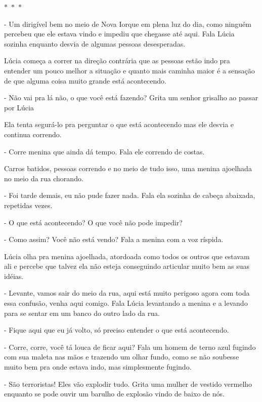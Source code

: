 \begin{center}
	$\ast$~$\ast$~$\ast$
\end{center}

- Um dirigível bem no meio de Nova Iorque em plena luz do dia, como ninguém percebeu que ele estava vindo e impediu que chegasse até aqui. Fala Lúcia sozinha enquanto desvia de algumas pessoas desesperadas.

Lúcia começa a correr na direção contrária que as pessoas estão indo pra entender um pouco melhor a situação e quanto mais caminha maior é a sensação de que alguma coisa muito grande está acontecendo.

- Não vai pra lá não, o que você está fazendo? Grita um senhor grisalho ao passar por Lúcia

Ela tenta segurá-lo pra perguntar o que está acontecendo mas ele desvia e continua correndo.

- Corre menina que ainda dá tempo. Fala ele correndo de costas.

Carros batidos, pessoas correndo e no meio de tudo isso, uma menina ajoelhada no meio da rua chorando.

- Foi tarde demais, eu não pude fazer nada. Fala ela sozinha de cabeça abaixada, repetidas vezes.

- O que está acontecendo? O que você não pode impedir?

- Como assim? Você não está vendo? Fala a menina com a voz ríspida.

Lúcia olha pra menina ajoelhada, atordoada como todos os outros que estavam ali e percebe que talvez ela não esteja conseguindo articular muito bem as suas idéias.

- Levante, vamos sair do meio da rua, aqui está muito perigoso agora com toda essa confusão, venha aqui comigo. Fala Lúcia levantando a menina e a levando para se sentar em um banco do outro lado da rua.

- Fique aqui que eu já volto, só preciso entender o que está acontecendo.

- Corre, corre, você tá louca de ficar aqui? Fala um homem de terno azul fugindo com sua maleta nas mãos e trazendo um olhar fundo, como se não soubesse muito bem pra onde estava indo, mas simplesmente fugindo.

- São terroristas! Eles vão explodir tudo. Grita uma mulher de vestido vermelho enquanto se pode ouvir um barulho de explosão vindo de baixo de nós.